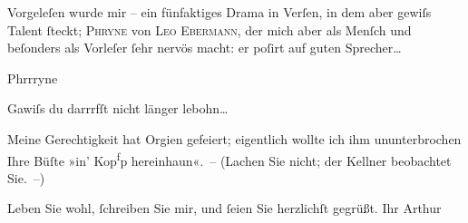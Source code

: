 \pstart
           Vorgeleſen wurde mir – ein fünfaktiges Drama in Verſen, in dem aber gewiſs Talent{ }ſteckt; \textsc{Phryne} von \textsc{Leo Ebermann}, der mich aber als Menſch und beſonders als Vorleſer{ }ſehr nervös macht: er
               poſirt auf guten Sprecher{\dots}\pend
           
\pstart
           Phrrryne{\dotstwo}\pend
           
\pstart
           Gawiſs {\dotstwo} du darrrfſt nicht länger lebohn{\dots}\pend
           
\pstart
           Meine Gerechtigkeit hat Orgien {\pb}gefeiert; eigentlich
               wollte ich ihm ununterbrochen Ihre Büſte »in’  Kop\substVorne{}\textsuperscript{f}\substDazwischen{}p\substHinten{} hereinhaun«. – (Lachen Sie nicht; der Kellner beobachtet Sie. –)\pend
           
\pstart
           Leben Sie wohl,{ }ſchreiben Sie mir, und{ }ſeien Sie herzlichſt gegrüßt.\pend
           \pstart Ihr \spacefill\mbox{Arthur}\pend{}\endnumbering{}  \newcommand{\dateiname}{L00376}\newcommand{\titel}{Arthur Schnitzler an Richard Beer-Hofmann, 5. 10. 1894}\newcommand{\editorInnen}{Martin Anton Müller und Gerd-Hermann Susen}
